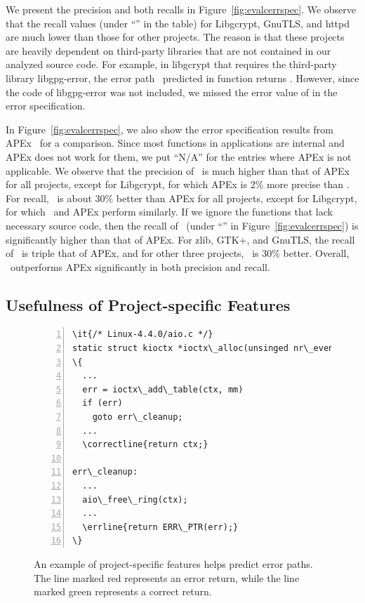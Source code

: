 \documentclass[12pt]{report}	%
\begin{document}
We present the precision and both recalls in Figure~\ref{fig:evalcerrspec}.
%
%
We observe that the recall values (under ``\newTool'' in the table) 
for Libgcrypt, GnuTLS, and httpd
are much lower than those for other projects.
The reason is that these projects are heavily dependent on third-party libraries
that are not contained in our analyzed source code.
For example,  in libgcrypt that requires the third-party library libgpg-error,
the error path \newTool\ predicted in function 
returns . 
However, since the code of libgpg-error was not included,
we missed the error value of 
in the error specification.

In Figure~\ref{fig:evalcerrspec}, we also 
show the error specification results from APEx~\cite{Kang:2016:AAI:2970276.2970354}
for a comparison. 
Since most functions in applications are internal and APEx does not work for them,
we put ``N/A'' for the entries where APEx is not applicable. 
%
We observe that the precision of \newTool\ is much higher than
that of APEx for all projects, except for Libgcrypt, for which 
APEx is 2\% more precise than \newTool. 
For recall, 
\newTool\ is about 30\% better than APEx for all projects, 
except for Libgcrypt, for which
\newTool\ and APEx perform similarly. 
If we ignore the functions that lack necessary source code, 
then the recall of \newTool\ 
(under ``\newTool*'' in Figure~\ref{fig:evalcerrspec}) is significantly
higher than that of APEx. For zlib, GTK+, and GnuTLS, the recall of
\newTool\ is triple that of APEx, and for other three projects, \newTool\
is 30\% better. 
%
Overall,
\newTool\ outperforms APEx significantly
in both precision and recall. 



\subsection{Usefulness of Project-specific Features}
\label{sec:app:eval:impact}

\begin{figure}
\centering
\begin{Verbatim}[numbers=left,xleftmargin=6mm,fontsize=\footnotesize,
    commandchars=\\\{\}]
\it{/* Linux-4.4.0/aio.c */}
static struct kioctx *ioctx\_alloc(unsinged nr\_events)
\{
  ...
  err = ioctx\_add\_table(ctx, mm)
  if (err)
    goto err\_cleanup;
  ...
  \correctline{return ctx;}

err\_cleanup:
  ...
  aio\_free\_ring(ctx);
  ...
  \errline{return ERR\_PTR(err);}
\}
\end{Verbatim}
\caption{An example of project-specific features helps predict error paths.
The line marked red represents an error return,
while the line marked green represents a correct return.}
\label{fig:psfeature-use}
\end{figure}
\end{document}
